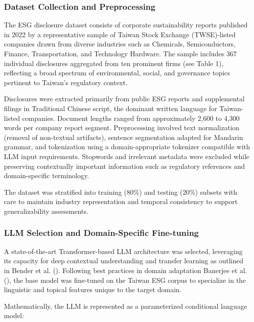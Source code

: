 \documentclass[
  12pt,
]{article}
\begin{document}
\subsubsection{Dataset Collection and
Preprocessing}\label{dataset-collection-and-preprocessing}

The ESG disclosure dataset consists of corporate sustainability reports
published in 2022 by a representative sample of Taiwan Stock Exchange
(TWSE)-listed companies drawn from diverse industries such as Chemicals,
Semiconductors, Finance, Transportation, and Technology Hardware. The
sample includes 367 individual disclosures aggregated from ten prominent
firms (see Table 1), reflecting a broad spectrum of environmental,
social, and governance topics pertinent to Taiwan's regulatory context.

Disclosures were extracted primarily from public ESG reports and
supplemental filings in Traditional Chinese script, the dominant written
language for Taiwan-listed companies. Document lengths ranged from
approximately 2,600 to 4,300 words per company report segment.
Preprocessing involved text normalization (removal of non-textual
artifacts), sentence segmentation adapted for Mandarin grammar, and
tokenization using a domain-appropriate tokenizer compatible with LLM
input requirements. Stopwords and irrelevant metadata were excluded
while preserving contextually important information such as regulatory
references and domain-specific terminology.

The dataset was stratified into training (80\%) and testing (20\%)
subsets with care to maintain industry representation and temporal
consistency to support generalizability assessments.

\subsubsection{LLM Selection and Domain-Specific
Fine-tuning}\label{llm-selection-and-domain-specific-fine-tuning}

A state-of-the-art Transformer-based LLM architecture was selected,
leveraging its capacity for deep contextual understanding and transfer
learning as outlined in Bender et al. ().
Following best practices in domain adaptation Banerjee et al.
(), the base model was fine-tuned on
the Taiwan ESG corpus to specialize in the linguistic and topical
features unique to the target domain.

Mathematically, the LLM is represented as a parameterized conditional
language model:
\end{document}
